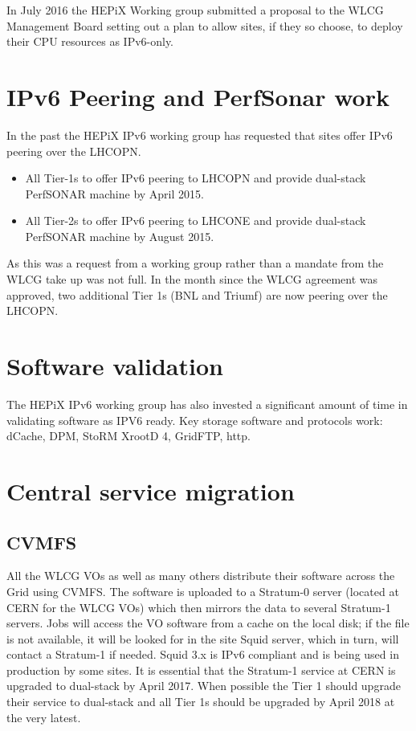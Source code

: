 \documentclass[a4paper]{jpconf}
\begin{document}
In July 2016 the HEPiX Working group submitted a proposal to the WLCG
Management Board setting out a plan to allow sites, if they so choose,
to deploy their CPU resources as IPv6-only.

\section{IPv6 Peering and PerfSonar work}
In the past the HEPiX IPv6 working group has requested that sites
offer IPv6 peering over the LHCOPN.
\begin{itemize}
\item All Tier-1s to offer IPv6 peering to LHCOPN and provide
  dual-stack PerfSONAR machine by April 2015.
\item All Tier-2s to offer IPv6 peering to LHCONE and provide
  dual-stack PerfSONAR machine by August 2015.
\end{itemize}
As this was a request from a working group rather than a mandate from
the WLCG take up was not full.  In the month since the WLCG agreement
was approved, two additional Tier 1s (BNL and Triumf) are now peering
over the LHCOPN.

\section{Software validation}
The HEPiX IPv6 working group has also invested a significant amount of
time in validating software as IPV6 ready. Key storage software and
protocols work: dCache, DPM, StoRM XrootD 4, GridFTP, http.

\section{Central service migration}
\subsection{CVMFS}
All the WLCG VOs as well as many others distribute their software
across the Grid using CVMFS. The software is uploaded to a Stratum-0
server (located at CERN for the WLCG VOs) which then mirrors the data
to several Stratum-1 servers\cite{Stratum1}.  Jobs will access the VO
software from a cache on the local disk; if the file is not available,
it will be looked for in the site Squid server, which in turn, will
contact a Stratum-1 if needed. Squid 3.x is IPv6 compliant and is
being used in production by some sites.  It is essential that the
Stratum-1 service at CERN is upgraded to dual-stack by April 2017.
When possible the Tier 1 should upgrade their service to dual-stack
and all Tier 1s should be upgraded by April 2018 at the very latest.
\end{document}
